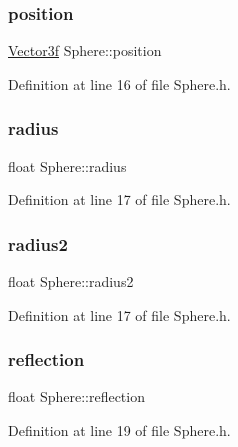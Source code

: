 \subsubsection{\texorpdfstring{position}{position}}
{\footnotesize\ttfamily \hyperlink{_vector3_8h_af345ad77ba5e240c7ab72b4b2077e754}{Vector3f} Sphere\+::position}



Definition at line 16 of file Sphere.\+h.

\mbox{\label{class_sphere_ae6f42f0da6679a2f0b4a22681ccccf38}} 
\subsubsection{\texorpdfstring{radius}{radius}}
{\footnotesize\ttfamily float Sphere\+::radius}



Definition at line 17 of file Sphere.\+h.

\mbox{\label{class_sphere_a676be49a940d037ac298e7010f03d416}} 
\subsubsection{\texorpdfstring{radius2}{radius2}}
{\footnotesize\ttfamily float Sphere\+::radius2}



Definition at line 17 of file Sphere.\+h.

\mbox{\label{class_sphere_a7b8835ace79e36f2cacf9ff0cb962fae}} 
\subsubsection{\texorpdfstring{reflection}{reflection}}
{\footnotesize\ttfamily float Sphere\+::reflection}



Definition at line 19 of file Sphere.\+h.

\mbox{\label{class_sphere_accdb6ecbf2c62a19c495debfe7c3685a}} 
